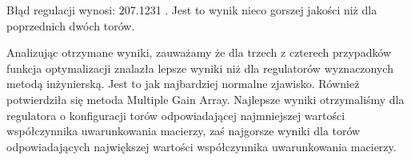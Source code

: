 Błąd regulacji wynosi: \num{207.1231} .
Jest to wynik nieco gorszej jakości niż dla poprzednich dwóch torów.

Analizując otrzymane wyniki, zauważamy że dla trzech z czterech przypadków funkcja optymalizacji
znalazła lepsze wyniki niż dla regulatorów wyznaczonych metodą inżynierską. Jest to jak najbardziej normalne zjawisko.
Również potwierdziła się metoda Multiple Gain Array. Najlepsze wyniki otrzymaliśmy dla regulatora o konfiguracji
torów odpowiadającej najmniejszej wartości współczynnika uwarunkowania macierzy, zaś najgorsze wyniki
dla torów odpowiadających największej wartości współczynnika uwarunkowania macierzy.